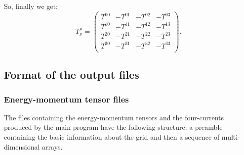 \documentclass[12pt, a4paper]{article}
\begin{document}
So, finally we get:
\begin{equation}
T^{\mu}_{\nu}=
\begin{pmatrix}
T^{00}&-T^{01}&-T^{02}&-T^{03}\\
T^{10}&-T^{11}&-T^{12}&-T^{13}\\
T^{20}&-T^{21}&-T^{22}&-T^{23}\\
T^{30}&-T^{31}&-T^{32}&-T^{33}\\
\end{pmatrix}.
\label{mixed_Tmunu_matrix}
\end{equation}
\subsection{Format of the output files}\label{app:formats}
\subsubsection{Energy-momentum tensor files}
The files containing the energy-momentum tensors and the four-currents produced by the main program have the following structure: a preamble containing the basic information about the grid and then a sequence of multi-dimensional arrays.\\
\end{document}
